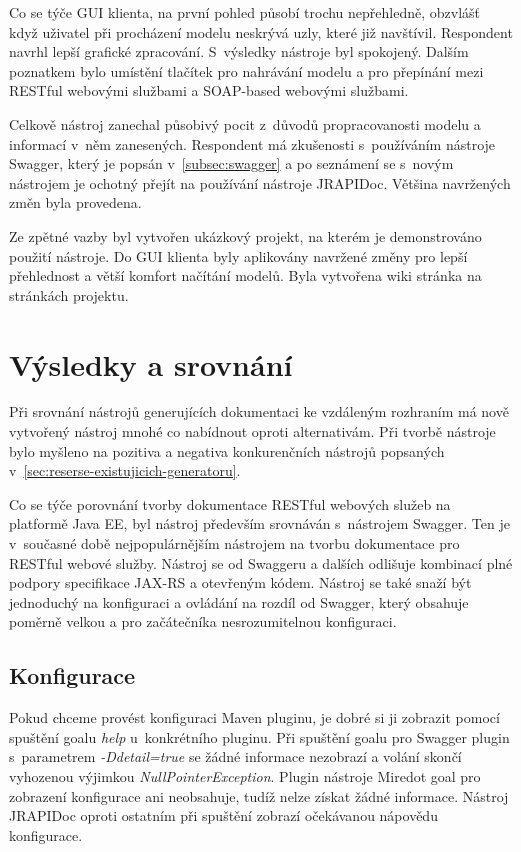 \documentclass[11pt,twoside,a4paper]{book}
\begin{document}
Co se týče GUI klienta, na první pohled působí trochu nepřehledně, obzvlášť když
uživatel při procházení modelu neskrývá uzly, které již navštívil. Respondent
navrhl lepší grafické zpracování. S~výsledky nástroje byl spokojený.
Dalším poznatkem bylo umístění tlačítek pro nahrávání modelu a pro přepínání
mezi RESTful webovými službami a SOAP-based webovými službami.

Celkově nástroj zanechal působivý pocit z~důvodů propracovanosti modelu a informací v~něm
zanesených. Respondent má zkušenosti s~používáním nástroje Swagger, který je
popsán v~\ref{subsec:swagger} a po seznámení se s~novým nástrojem je ochotný přejít na
používání nástroje JRAPIDoc. Většina navržených změn byla provedena.

Ze zpětné vazby byl vytvořen ukázkový projekt\cite{JRAPIDocExampleProjHome}, na
kterém je demonstrováno použití nástroje.
Do GUI klienta byly aplikovány navržené změny pro lepší přehlednost a větší komfort
načítání modelů. Byla vytvořena wiki stránka na stránkách
projektu\cite{JRAPIDocHome}.

\chapter{Výsledky a srovnání}
\label{ch:vysledky-a-srovnani}

Při srovnání nástrojů generujících dokumentaci ke vzdáleným rozhraním má nově
vytvořený nástroj mnohé co nabídnout oproti alternativám. Při tvorbě nástroje
bylo myšleno na pozitiva a negativa konkurenčních nástrojů popsaných
v~\ref{sec:reserse-existujicich-generatoru}.

Co se týče porovnání tvorby dokumentace RESTful webových služeb na platformě
Java EE, byl nástroj především srovnáván s~nástrojem Swagger. Ten je v~současné
době nejpopulárnějším nástrojem na tvorbu dokumentace pro RESTful webové služby.
Nástroj se od Swaggeru a dalších odlišuje kombinací plné podpory specifikace
JAX-RS a otevřeným kódem. Nástroj se také snaží být jednoduchý na konfiguraci a
ovládání na rozdíl od Swagger, který obsahuje poměrně velkou a pro začátečníka
nesrozumitelnou konfiguraci.

\section{Konfigurace}

Pokud chceme provést konfiguraci Maven pluginu, je dobré si ji zobrazit pomocí
spuštění goalu {\em help} u~konkrétního pluginu. Při spuštění goalu pro Swagger
plugin s~parametrem {\em -Ddetail=true} se žádné informace nezobrazí a volání
skončí vyhozenou výjimkou {\em NullPointerException}. Plugin nástroje Miredot
goal pro zobrazení konfigurace ani neobsahuje, tudíž nelze získat žádné
informace. Nástroj JRAPIDoc oproti ostatním při spuštění zobrazí očekávanou
nápovědu konfigurace.
\end{document}
